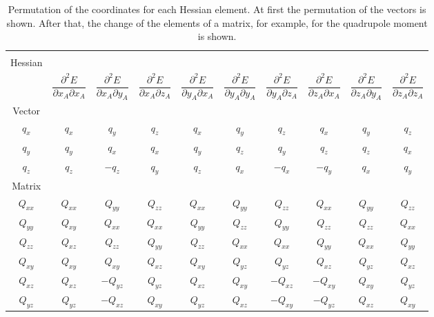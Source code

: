 \begin{table}[H]
    \centering
    \caption[]{Permutation of the coordinates for each Hessian element.
    At first the permutation of the vectors is shown.
    After that, the change of the elements of a matrix, for example, for the quadrupole moment is shown.}
        \begin{tabular}{c c c c c c c c c c}
            \hline\\[-1em]
            Hessian &\\
            &$\dfrac{\partial^2 E}{\partial x_A \partial x_A}$ & $\dfrac{\partial^2 E}{\partial x_A \partial y_A}$ &
            $\dfrac{\partial^2 E}{\partial x_A \partial z_A}$ &$\dfrac{\partial^2 E}{\partial y_A \partial x_A}$ &
            $\dfrac{\partial^2 E}{\partial y_A \partial y_A}$ &$\dfrac{\partial^2 E}{\partial y_A \partial z_A}$ &
            $\dfrac{\partial^2 E}{\partial z_A \partial x_A}$ & $\dfrac{\partial^2 E}{\partial z_A \partial y_A}$ &
            $\dfrac{\partial^2 E}{\partial z_A \partial z_A}$ \\[+0.7em]
            \hline
            Vector\\
            $q_x$ &  $q_x$  &  $q_y$    & $q_z$  & $q_x$   &$q_y$   & $q_z$     &$q_x$     & $q_y$  & $q_z$\\ 
        $q_y$ & $q_y$  &  $q_x$   & $q_x$  & $q_y$   & $q_z$  & $q_y$     & $q_z$    & $q_z$  & $q_x$ \\
            $q_z$ &  $q_z$  & $-q_z$  & $q_y$  & $q_z$   &$q_x$   &$-q_x$   & $-q_y$ & $q_x$  & $q_y$\\
            \hline 
            Matrix\\
            $Q_{xx}$ & $Q_{xx}$ & $Q_{yy}$    & $Q_{zz}$ & $Q_{xx}$  & $Q_{yy}$ & $Q_{zz}$    & $Q_{xx}$   & $Q_{yy}$ & $Q_{zz}$ \\
            $Q_{yy}$ & $Q_{xy}$ & $Q_{xx}$    & $Q_{xx}$ & $Q_{yy}$  & $Q_{zz}$ & $Q_{yy}$    & $Q_{zz}$   & $Q_{zz}$ & $Q_{xx}$ \\
            $Q_{zz}$ & $Q_{xz}$ & $Q_{zz}$    & $Q_{yy}$ & $Q_{zz}$  & $Q_{xx}$ & $Q_{xx}$    & $Q_{yy}$   & $Q_{xx}$ & $Q_{yy}$ \\
            $Q_{xy}$ & $Q_{xy}$ & $Q_{xy}$    & $Q_{xz}$ & $Q_{xy}$  & $Q_{yz}$ & $Q_{yz}$    & $Q_{xz}$   & $Q_{yz}$ & $Q_{xz}$ \\
            $Q_{xz}$ & $Q_{xz}$ & $-Q_{yz}$ & $Q_{yz}$ & $Q_{xz}$  & $Q_{xy}$ & $-Q_{xz}$ & $-Q_{xy}$& $Q_{xy}$ & $Q_{yz}$ \\
            $Q_{yz}$ & $Q_{yz}$ & $-Q_{xz}$ & $Q_{xy}$ & $Q_{yz}$  & $Q_{xz}$ & $-Q_{xy}$ & $-Q_{yz}$& $Q_{xz}$ & $Q_{xy}$ \\
            \hline 
        \end{tabular}
    \label{tab:Permutation}
\end{table}


